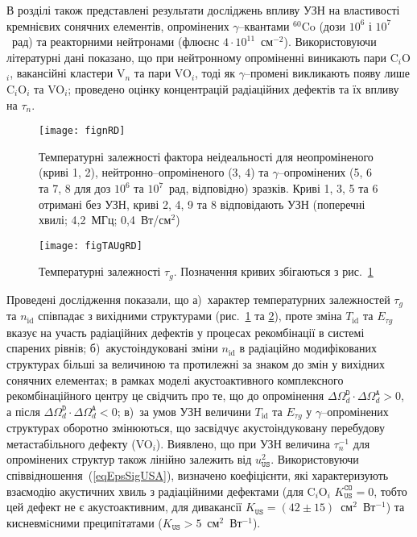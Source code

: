 В розділі також представлені результати досліджень впливу УЗН на властивості кремнієвих сонячних елементів,
опромінених $\gamma$--квантами $^{60}$Co (дози $10^6$ і $10^7$~рад) та реакторними нейтронами (флюєнс $4\cdot10^{11}$~см$^{-2}$).
Використовуючи літературні дані показано, що при нейтронному опроміненні виникають пари C$_i$O$_i$,
вакансійні кластери V$_n$ та пари VO$_i$, тоді як $\gamma$--промені викликають появу лише C$_i$O$_i$ та VO$_i$;
проведено оцінку концентрацій радіаційних дефектів та їх впливу на $\tau_n$.

\begin{figure}[ht]
\center
\texttt{[image: fignRD]}%
\caption{\label{fignRD}
Температурні залежності фактора неідеальності
для неопроміненого (криві 1, 2),
нейтронно--опроміненого (3, 4) та
$\gamma$--опромінених (5, 6 та 7, 8 для доз $10^6$ та $10^7$~рад, відповідно)
зразків.
Криві 1, 3, 5 та 6 отримані без УЗН,
криві 2, 4, 9 та 8 відповідають УЗН (поперечні хвилі; 4,2~МГц; 0,4~Вт/см$^2$)
}%
\end{figure}


\begin{figure}[t]
\center
\texttt{[image: figTAUgRD]}%
\caption{\label{figTAUgRD}
Температурні залежності $\tau_g$.
Позначення кривих збігаються з рис.~\ref{fignRD}
}%
\end{figure}

Проведені дослідження показали, що
а)~характер температурних залежностей  $\tau_{g}$ та $n_\mathrm{id}$ співпадає з вихідними структурами (рис.~\ref{fignRD} та \ref{figTAUgRD}), проте зміна $T_{\mathrm{id}}$ та $E_{\tau g}$ вказує на участь радіаційних дефектів у процесах рекомбінації в системі спарених рівнів;
б)~акустоіндуковані зміни $n_\mathrm{id}$ в радіаційно модифікованих структурах більші за величиною та протилежні за знаком до змін у вихідних сонячних елементах;
в рамках моделі акустоактивного комплексного рекомбінаційного центру це свідчить про те, що до опромінення $\Delta\Omega_d^\mathtt{D}\cdot\Delta\Omega_d^\mathtt{A}>0$, а після $\Delta\Omega_d^\mathtt{D}\cdot\Delta\Omega_d^\mathtt{A}<0$;
в)~за умов УЗН величини $T_{\mathrm{id}}$ та $E_{\tau g}$ у $\gamma$--опромінених структурах оборотно змінюються,
що засвідчує акустоіндуковану перебудову метастабільного дефекту (VO$_i$).
Виявлено, що при УЗН величина $\tau_n^{-1}$ для опромінених структур також лінійно залежить від $u_{\mathtt{US}}^2$.
Використовуючи співвідношення~(\ref{eqEpsSigUSA}), визначено коефіцієнти, які характеризують взаємодію акустичних хвиль з радіаційними дефектами (для C$_i$O$_i$ $K_\mathtt{US}^\mathtt{CO}=0$, тобто цей дефект не є акустоактивним,
для дивакансії $K_\mathtt{US}=(42\pm15)$~см$^2$~Вт$^{-1}$)
та кисневмiсними преципiтатами ($K_\mathtt{US}>5$~см$^2$~Вт$^{-1}$).

